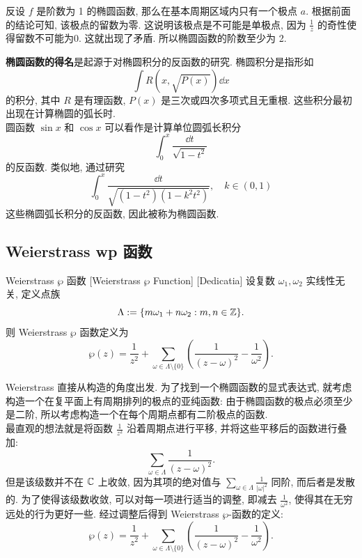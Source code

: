         \begin{prf}
            反设 \(f\) 是阶数为 1 的椭圆函数, 那么在基本周期区域内只有一个极点 \(a\). 根据前面的结论可知, 该极点的留数为零. 这说明该极点是不可能是单极点, 因为 \(\frac{1}{z}\) 的奇性使得留数不可能为0. 这就出现了矛盾. 所以椭圆函数的阶数至少为 2.
        \end{prf}

        \begin{rmk}
            \textbf{椭圆函数的得名}是起源于对椭圆积分的反函数的研究. 椭圆积分是指形如
            \[\int R\left(x,\sqrt{P(x)}\right)\dd{x}\]
            的积分, 其中 \(R\) 是有理函数, \(P(x)\) 是三次或四次多项式且无重根. 这些积分最初出现在计算椭圆的弧长时. \\
            圆函数 \(\sin x\) 和 \(\cos x\) 可以看作是计算单位圆弧长积分
            \[\int_{0}^{x}\frac{\dd{t}}{\sqrt{1-t^2}}\]
            的反函数. 类似地, 通过研究
            \[\int_{0}^{x}\frac{\dd{t}}{\sqrt{(1-t^2)(1-k^2t^2)}},\quad k\in(0,1)\]
            这些椭圆弧长积分的反函数, 因此被称为椭圆函数.
        \end{rmk}

    \subsection{Weierstrass wp 函数}

        \begin{dfn}
            [Weierstrass-wp]
            {Weierstrass \(\wp\) 函数}
            [Weierstrass \(\wp\) Function]
            [Dedicatia]
            设复数 \(\omega_1,\omega_2\) 实线性无关, 定义点族
            \[\Lambda:=\{m\omega_1+n\omega_2:m,n\in\operatorname{\mathbb{Z}}\}.\]
            则 Weierstrass \(\wp\) 函数定义为
            \[\wp(z)=\frac{1}{z^2}+\sum_{\omega\in\Lambda\setminus\{0\}}\left(\frac{1}{(z-\omega)^2}-\frac{1}{\omega^2}\right).\]
        \end{dfn}

        \begin{rmk}
            [Dedicatia]
            Weierstrass 直接从构造的角度出发. 为了找到一个椭圆函数的显式表达式, 就考虑构造一个在复平面上有周期排列的极点的亚纯函数: 由于椭圆函数的极点必须至少是二阶, 所以考虑构造一个在每个周期点都有二阶极点的函数. \\
            最直观的想法就是将函数 \(\frac{1}{z^2}\) 沿着周期点进行平移, 并将这些平移后的函数进行叠加:
            \[\sum_{\omega\in\Lambda}\frac{1}{(z-\omega)^2}.\]
            但是该级数并不在 \(\operatorname{\mathbb{C}}\) 上收敛, 因为其项的绝对值与 \(\sum_{\omega\in\Lambda}\frac{1}{|\omega|^2}\) 同阶, 而后者是发散的. 为了使得该级数收敛, 可以对每一项进行适当的调整, 即减去 \(\frac{1}{\omega^2}\), 使得其在无穷远处的行为更好一些. 经过调整后得到 Weierstrass \(\wp\)-函数的定义:
            \[\wp(z)=\frac{1}{z^2}+\sum_{\omega\in\Lambda\setminus\{0\}}\left(\frac{1}{(z-\omega)^2}-\frac{1}{\omega^2}\right).\]
        \end{rmk}

